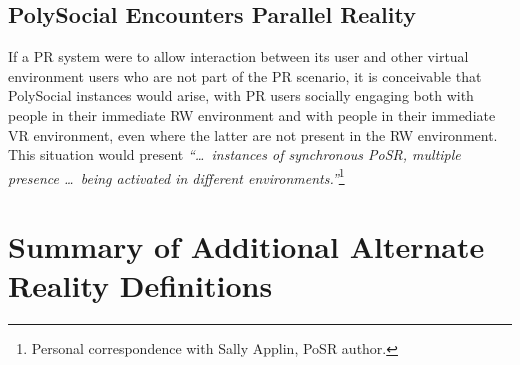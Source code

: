 
\subsection{PolySocial Encounters Parallel Reality}

If a PR system were to allow interaction between its user and other virtual environment users who are not part of the PR scenario, it is conceivable that PolySocial instances would arise, with PR users socially engaging both with people in their immediate RW environment and with people in their immediate VR environment, even where the latter are not present in the RW environment. This situation would present \textit{``\ldots\ instances of synchronous PoSR, multiple presence \ldots\ being activated in different environments.''}\footnote{Personal correspondence with Sally Applin, PoSR author.}


\section{Summary of Additional Alternate Reality Definitions}
\label{summaryofadditionalalternaterealitydefinitions}

